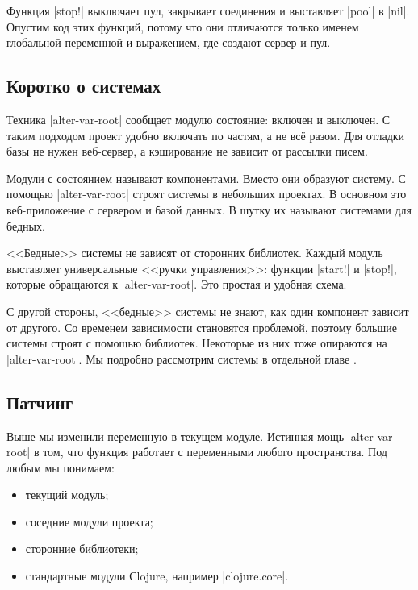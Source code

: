 Функция \spverb|stop!| выключает пул, закрывает соединения и выставляет
\spverb|pool| в \spverb|nil|. Опустим код этих функций, потому что они
отличаются только именем глобальной переменной и выражением, где создают сервер
и пул.

\subsection{Коротко о системах}

\label{systems-intro}

Техника \spverb|alter-var-root| сообщает модулю состояние: включен и выключен. С
таким подходом проект удобно включать по частям, а не вс\"{е} разом. Для отладки
базы не нужен веб-сервер, а кэширование не зависит от рассылки писем.

Модули с состоянием называют компонентами. Вместо они образуют систему. С
помощью \spverb|alter-var-root| строят системы в небольших проектах. В основном
это веб-приложение с сервером и базой данных. В шутку их называют системами для
бедных.

<<Бедные>> системы не зависят от сторонних библиотек. Каждый модуль выставляет
универсальные <<ручки управления>>: функции \spverb|start!| и \spverb|stop!|,
которые обращаются к \spverb|alter-var-root|. Это простая и удобная схема.

С другой стороны, <<бедные>> системы не знают, как один компонент зависит от
другого. Со временем зависимости становятся проблемой, поэтому большие системы
строят с помощью библиотек. Некоторые из них тоже опираются на
\spverb|alter-var-root|. Мы подробно рассмотрим системы в отдельной
главе .

\subsection{Патчинг}

Выше мы изменили переменную в текущем модуле. Истинная мощь
\spverb|alter-var-root| в том, что функция работает с переменными любого
пространства. Под любым мы понимаем:

\begin{itemize}

\item
  текущий модуль;

\item
  соседние модули проекта;

\item
  сторонние библиотеки;

\item
  стандартные модули Сlojure, например \spverb|clojure.core|.

\end{itemize}

